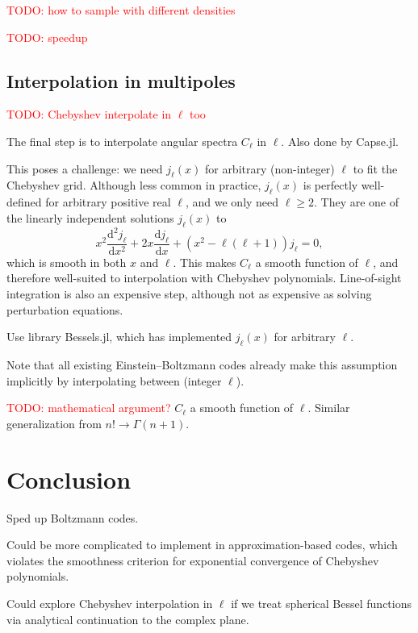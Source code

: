 \documentclass{aa}
\newcommand\TODO[1]{\textcolor{red}{TODO: #1}}
\begin{document}
\TODO{how to sample with different densities}

\TODO{speedup}

\subsection{Interpolation in multipoles}

\TODO{Chebyshev interpolate in $\ell$ too}

The final step is to interpolate angular spectra $C_\ell$ in $\ell$.
Also done by Capse.jl.

This poses a challenge: we need $j_\ell(x)$ for arbitrary (non-integer) $\ell$ to fit the Chebyshev grid.
Although less common in practice, $j_\ell(x)$ is perfectly well-defined for arbitrary positive real $\ell$, and we only need $\ell \geq 2$.
They are one of the linearly independent solutions $j_\ell(x)$ to
\begin{equation}
	x^2 \frac{\mathrm{d}^2 j_\ell}{\mathrm{d} x^2} + 2x \frac{\mathrm{d} j_\ell}{\mathrm{d} x} + \left( x^2 - \ell(\ell+1) \right) j_\ell = 0,
\end{equation}
which is smooth in both $x$ and $\ell$.
This makes $C_\ell$ a smooth function of $\ell$, and therefore well-suited to interpolation with Chebyshev polynomials.
Line-of-sight integration is also an expensive step, although not as expensive as solving perturbation equations.

Use library Bessels.jl, which has implemented $j_\ell(x)$ for arbitrary $\ell$.

Note that all existing Einstein--Boltzmann codes already make this assumption implicitly by interpolating between (integer $\ell$).

\TODO{mathematical argument?}
$C_\ell$ a smooth function of $\ell$.
Similar generalization from $n! \rightarrow \Gamma(n+1)$.

\section{Conclusion}
\label{sec:conclusion}

Sped up Boltzmann codes.

Could be more complicated to implement in approximation-based codes, which violates the smoothness criterion for exponential convergence of Chebyshev polynomials.

Could explore Chebyshev interpolation in $\ell$ if we treat spherical Bessel functions via analytical continuation to the complex plane.
\end{document}
